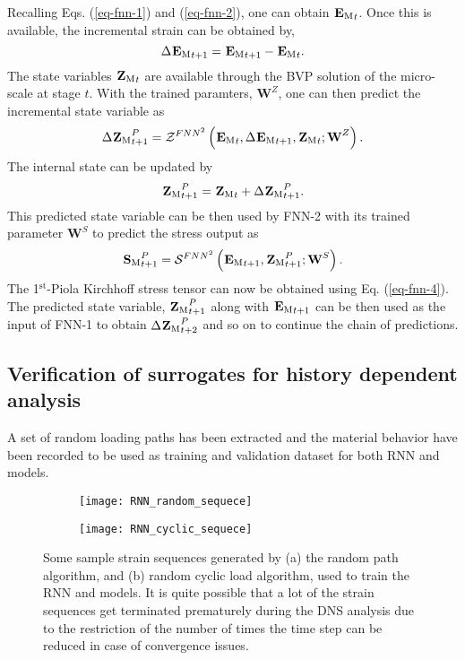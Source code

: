 Recalling Eqs. (\ref{eq-fnn-1}) and (\ref{eq-fnn-2}), one can obtain $ {^{}\textbf{E}_\text{M}}_t $. Once this is available, the incremental strain can be obtained by,
\begin{equation}\label{eq-fnn2-1}
\Delta{^{}\textbf{E}_\text{M}}_{t+1}={^{}\textbf{E}_\text{M}}_{t+1}-{^{}\textbf{E}_\text{M}}_{t}.
\end{equation}
The state variables $ {^{}\textbf{Z}_\text{M}}_t $ are available through the BVP solution of the micro-scale at stage $ t $. With the trained paramters, $ \textbf{W}^Z $, one can then predict the incremental state variable as
\begin{equation}\label{eq-fnn2-2}
\Delta{^{}\textbf{Z}_\text{M}}_{t+1}^P=\mathcal{Z}^{FNN^2}\left({^{}\textbf{E}_\text{M}}_t,\Delta{^{}\textbf{E}_\text{M}}_{t+1},{^{}\textbf{Z}_\text{M}}_t;\textbf{W}^Z\right).
\end{equation}
The internal state can be updated by
\begin{equation}\label{eq-fnn2-3}
{^{}\textbf{Z}_\text{M}}_{t+1}^P={^{}\textbf{Z}_\text{M}}_t+\Delta{^{}\textbf{Z}_\text{M}}_{t+1}^P.
\end{equation}
This predicted state variable can be then used by FNN-2 with its trained parameter $ \textbf{W}^S $ to predict the stress output as
\begin{equation}\label{eq-fnn2-4}
{^{}\textbf{S}_\text{M}}_{t+1}^P=\mathcal{S}^{FNN^2}\left({^{}\textbf{E}_\text{M}}_{t+1},{^{}\textbf{Z}_\text{M}}_{t+1}^P;\textbf{W}^S\right).
\end{equation} 
The 1$^\text{st} $-Piola Kirchhoff stress tensor can now be obtained using Eq. (\ref{eq-fnn-4}). The predicted state variable, $ {^{}\textbf{Z}_\text{M}}^P_{t+1} $ along with $ {^{}\textbf{E}_\text{M}}_{t+1} $ can be then used as the input of FNN-1 to obtain $ \Delta{^{}\textbf{Z}_\text{M}}_{t+2}^P $ and so on to continue the chain of predictions.

\subsection{Verification of surrogates for history dependent analysis}
A set of random loading paths has been extracted and the material behavior have been recorded to be used as training and validation dataset for both RNN and \fnn models.

\begin{figure}
	\centering
	\begin{subfigure}{0.49\textwidth}
		\texttt{[image: RNN\_random\_sequece]}
		\caption{}
	\end{subfigure}
	\begin{subfigure}{0.49\textwidth}
		\texttt{[image: RNN\_cyclic\_sequece]}
		\caption{}
	\end{subfigure}
	\caption{Some sample strain sequences generated by (a) the random path algorithm, and (b) random cyclic load algorithm, used to train the RNN and \fnn models. It is quite possible that a lot of the strain sequences get terminated prematurely during the DNS analysis due to the restriction of the number of times the time step can be reduced in case of convergence issues.}\label{fig-rnn-1}
\end{figure}

